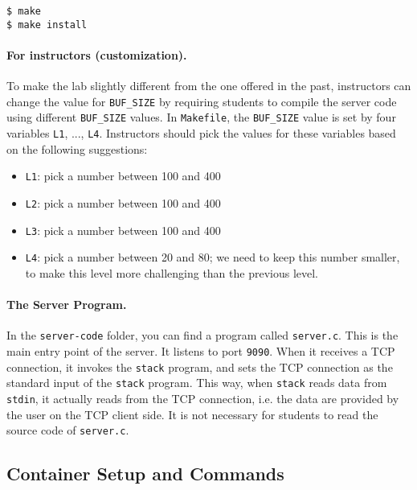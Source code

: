 \begin{lstlisting}
$ make
$ make install
\end{lstlisting}
 

\paragraph{For instructors (customization).}
To make the lab slightly different from the one offered in the past,
instructors can change the value for \texttt{BUF\_SIZE} by requiring
students to compile the server code using different \texttt{BUF\_SIZE} values.
In \texttt{Makefile}, the \texttt{BUF\_SIZE} value is set by
four variables \texttt{L1}, ..., \texttt{L4}.
Instructors should pick the values for these variables based
on the following suggestions:

\begin{itemize}[noitemsep]
\item \texttt{L1}: pick a number between 100 and 400
\item \texttt{L2}: pick a number between 100 and 400
\item \texttt{L3}: pick a number between 100 and 400
\item \texttt{L4}: pick a number between 20 and 80;
we need to keep this number smaller, to make this level more challenging 
than the previous level. 
\end{itemize}



\paragraph{The Server Program.} 
In the \texttt{server-code} folder, you can find a program called \texttt{server.c}. 
This is the main entry point of the server. It listens to port \texttt{9090}. 
When it receives a TCP connection, it 
invokes the \texttt{stack} program, and sets the TCP connection
as the standard input of the \texttt{stack} program. This way,
when \texttt{stack} reads data from \texttt{stdin}, it actually 
reads from the TCP connection, i.e. the data are provided by
the user on the TCP client side. It is not necessary for 
students to read the source code of \texttt{server.c}.  


\subsection{Container Setup and Commands}

